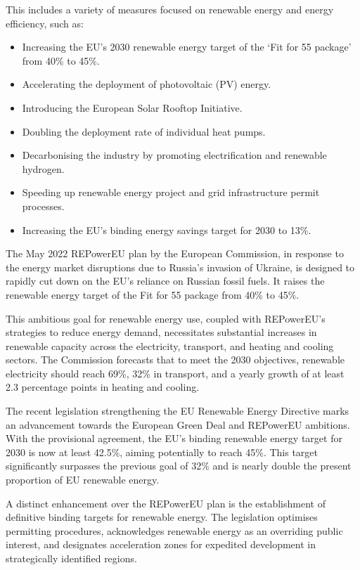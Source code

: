 This includes a variety of measures focused on renewable energy and energy efficiency, such as:

\begin{itemize}
    \item Increasing the EU's 2030 renewable energy target of the `Fit for 55 package' from 40\% to 45\%.
    \item Accelerating the deployment of photovoltaic (PV) energy.
    \item Introducing the European Solar Rooftop Initiative.
    \item Doubling the deployment rate of individual heat pumps.
    \item Decarbonising the industry by promoting electrification and renewable hydrogen.
    \item Speeding up renewable energy project and grid infrastructure permit processes.
    \item Increasing the EU’s binding energy savings target for 2030 to 13\%.
\end{itemize}

The May 2022 REPowerEU plan by the European Commission, in response to the energy market disruptions due to Russia's invasion of Ukraine, is designed to rapidly cut down on the EU's reliance on Russian fossil fuels. It raises the renewable energy target of the Fit for 55 package from 40\% to 45\%.

This ambitious goal for renewable energy use, coupled with REPowerEU’s strategies to reduce energy demand, necessitates substantial increases in renewable capacity across the electricity, transport, and heating and cooling sectors. The Commission forecasts that to meet the 2030 objectives, renewable electricity should reach 69\%, 32\% in transport, and a yearly growth of at least 2.3 percentage points in heating and cooling.



The recent legislation strengthening the EU Renewable Energy Directive marks an advancement towards the European Green Deal and REPowerEU ambitions. With the provisional agreement, the EU's binding renewable energy target for 2030 is now at least 42.5\%, aiming potentially to reach 45\%. This target significantly surpasses the previous goal of 32\% and is nearly double the present proportion of EU renewable energy.

A distinct enhancement over the REPowerEU plan is the establishment of definitive binding targets for renewable energy. The legislation optimises permitting procedures, acknowledges renewable energy as an overriding public interest, and designates acceleration zones for expedited development in strategically identified regions.

